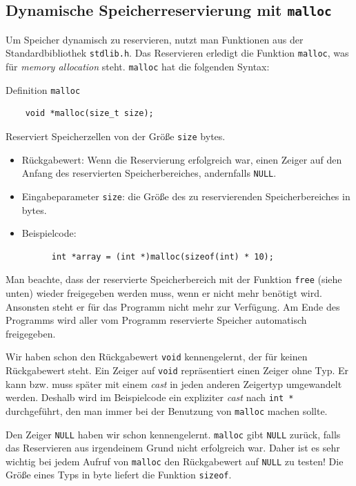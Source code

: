 \subsection{Dynamische Speicherreservierung mit \texttt{malloc}}

Um Speicher dynamisch zu reservieren, nutzt man Funktionen aus der Standardbibliothek \verb|stdlib.h|.
Das Reservieren erledigt die Funktion \verb|malloc|, was für \emph{memory allocation} steht.
\verb|malloc| hat die folgenden Syntax:
\begin{mydefinitionblock}{Definition \texttt{malloc}}
  \begin{lstlisting}
    void *malloc(size_t size);
  \end{lstlisting}
  Reserviert Speicherzellen von der Größe \verb|size| bytes.
  \begin{itemize} 
    \itemsep0.2pt
  \item Rückgabewert: Wenn die Reservierung erfolgreich war, einen Zeiger auf den Anfang des
    reservierten Speicherbereiches, andernfalls \verb|NULL|.
  \item Eingabeparameter \verb|size|: die Größe des zu reservierenden Speicherbereiches in bytes.
  \item Beispielcode:
    \begin{lstlisting}
      int *array = (int *)malloc(sizeof(int) * 10);
    \end{lstlisting}
  \end{itemize}
  Man beachte, dass der reservierte Speicherbereich mit der Funktion \verb|free| (siehe unten) wieder freigegeben werden muss, wenn er nicht mehr benötigt wird. 
  Ansonsten steht er für das Programm nicht mehr zur Verfügung.
  Am Ende des Programms wird aller vom Programm reservierte Speicher automatisch freigegeben.
\end{mydefinitionblock}
Wir haben schon den Rückgabewert \verb|void| kennengelernt, der für keinen Rückgabewert steht.
Ein Zeiger auf \verb|void| repräsentiert einen Zeiger ohne Typ.
Er kann bzw. muss später mit einem \emph{cast} in jeden anderen Zeigertyp umgewandelt werden.
Deshalb wird im Beispielcode ein expliziter \emph{cast} nach \verb|int *| durchgeführt, den man immer bei der Benutzung von \verb|malloc| machen sollte.

Den Zeiger \verb|NULL| haben wir schon kennengelernt. 
\verb|malloc| gibt \verb|NULL| zurück, falls das Reservieren aus irgendeinem Grund nicht erfolgreich war.
Daher ist es sehr wichtig bei jedem Aufruf von \verb|malloc| den Rückgabewert auf \verb|NULL| zu testen!
Die Größe eines Typs in byte liefert die Funktion \verb|sizeof|.

